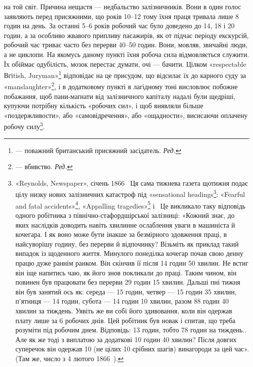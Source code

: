 \parcont{}  %
на той світ. Причина нещастя — недбальство залізничників. Вони
в один голос заявляють перед присяжними, що років 10--12 тому
їхня праця тривала лише 8 годин на день. За останні 5--6 років
робочий час було доведено до 14, 18 і 20 годин, а за особливо
жвавого припливу пасажирів, як от підчас періоду екскурсій,
робочий час триває часто без перерви 40--50 годин. Вони, мовляв,
звичайні люди, а не циклопи. На якомусь даному пункті
їхня робоча сила відмовляється служити. Їх обіймає одубілість,
мозок перестає думати, очі — бачити. Цілком «respectable Вгіtish,
Juryman»\footnote*{
— поважний британський присяжний засідатель. \emph{Ред.}
} відповідає на це присудом, що відсилає їх до
карного суду за «manslaughter»\footnote*{
— вбивство. \emph{Ред.}
}, і в додатковому пункті в лагідному
тоні висловлює побожне побажання, щоб пани-маґнати
від залізничного капіталу надалі були щедріші, купуючи потрібну
кількість «робочих сил», і щоб виявляли більше «поздержливости»,
або «самовідречення», або «ощадности», висисаючи
оплачену робочу силу\footnote{
«Reynolds, Newspaper», січень 1866~ Ця сама тижнева газета щотижня
подає цілу низку нових залізничних катастроф під «sensational headings\footnote*{
— сенсаційними заголовками. \emph{Ред.}
}:
«Fearful and fatal accidents»\footnote*{
Жахливий і фатальний випадок. \emph{Ред.}
}, «Appalling tragedies»\footnote*{
Жахлива трагедія. \emph{Ред.}
} і~
Це викликало таку відповідь одного робітника з північно-стафордшірської
залізниці: «Кожний знає, до яких наслідків доводить навіть хвилинне
ослаблення уваги в машиніста й кочегара. І як воно може бути інакше
за безмірного здовження праці, в найсуворішу годину, без перерви й відпочинку?
Візьміть як приклад такий випадок із щоденного життя. Минулого
понеділка кочегар почав свою денну працю дуже раннім ранком.
Він скінчив її після 14 годин 50 хвилин. Не встиг він іще напитись чаю,
як його знов покликали до праці. Таким чином, він повинен був працювати
без перерви 29 годин 15 хвилин. Дальші пні тижня він був занятий ось
як: середа — 15 годин, четвер — 15 годин 35 хвилин, п’ятниця — 14 годин,
субота — 14 годин 10 хвилин, разом 88 годин 40 хвилин за тиждень.
Уявіть же ви собі його здивовання, коли він одержав плату лише за 6 робочих
днів. Цей робітник був новак і спитав, що треба розуміти під робочим
днем. Відповідь: 13 годин, тобто 78 годин на тиждень.. Але як же тоді
з виплатою за додаткові 10 годин 40 хвилин? Після довгих суперечок він
одержав 10 (не цілих 10 срібних шагів) винагороди за цей час».
(Там же, число з 4 лютого 1866~).
}.

